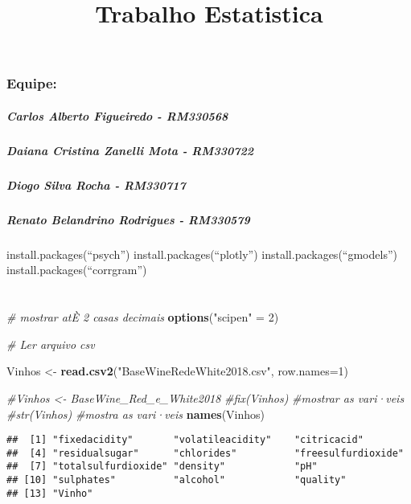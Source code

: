 \documentclass[]{article}
\title{Trabalho Estatistica}
\author{}
\date{}
\newenvironment{Shaded}{\begin{snugshade}}{\end{snugshade}}
\newcommand{\KeywordTok}[1]{\textcolor[rgb]{0.13,0.29,0.53}{\textbf{#1}}}
\newcommand{\DataTypeTok}[1]{\textcolor[rgb]{0.13,0.29,0.53}{#1}}
\newcommand{\DecValTok}[1]{\textcolor[rgb]{0.00,0.00,0.81}{#1}}
\newcommand{\StringTok}[1]{\textcolor[rgb]{0.31,0.60,0.02}{#1}}
\newcommand{\CommentTok}[1]{\textcolor[rgb]{0.56,0.35,0.01}{\textit{#1}}}
\newcommand{\NormalTok}[1]{#1}
\let\oldsubparagraph\subparagraph
\renewcommand{\subparagraph}[1]{\oldsubparagraph{#1}\mbox{}}
\begin{document}
\maketitle

\subsubsection{Equipe:}\label{equipe}

\subparagraph{Carlos Alberto Figueiredo -
RM330568}\label{carlos-alberto-figueiredo---rm330568}

\subparagraph{Daiana Cristina Zanelli Mota -
RM330722}\label{daiana-cristina-zanelli-mota---rm330722}

\subparagraph{Diogo Silva Rocha -
RM330717}\label{diogo-silva-rocha---rm330717}

\subparagraph{Renato Belandrino Rodrigues -
RM330579}\label{renato-belandrino-rodrigues---rm330579}

install.packages(``psych'') install.packages(``plotly'')
install.packages(``gmodels'') install.packages(``corrgram'')

\section{}\label{section}

\begin{Shaded}
\begin{Highlighting}[]
\CommentTok{# mostrar atÈ 2 casas decimais}
\KeywordTok{options}\NormalTok{(}\StringTok{"scipen"}\NormalTok{ =}\StringTok{ }\DecValTok{2}\NormalTok{)}

\CommentTok{# Ler arquivo csv}


\NormalTok{Vinhos <-}\StringTok{ }\KeywordTok{read.csv2}\NormalTok{(}\StringTok{"BaseWineRedeWhite2018.csv"}\NormalTok{, }\DataTypeTok{row.names=}\DecValTok{1}\NormalTok{)}
\end{Highlighting}
\end{Shaded}

\begin{Shaded}
\begin{Highlighting}[]
\CommentTok{#Vinhos <- BaseWine_Red_e_White2018}
\CommentTok{#fix(Vinhos)}
\CommentTok{#mostrar as vari·veis}
\CommentTok{#str(Vinhos)}
\CommentTok{#mostra as vari·veis}
\KeywordTok{names}\NormalTok{(Vinhos)}
\end{Highlighting}
\end{Shaded}

\begin{verbatim}
##  [1] "fixedacidity"       "volatileacidity"    "citricacid"        
##  [4] "residualsugar"      "chlorides"          "freesulfurdioxide" 
##  [7] "totalsulfurdioxide" "density"            "pH"                
## [10] "sulphates"          "alcohol"            "quality"           
## [13] "Vinho"
\end{verbatim}
\end{document}
